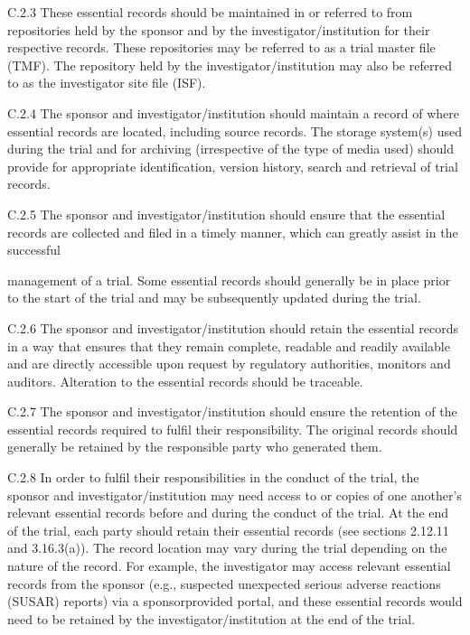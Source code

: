 \documentclass[11pt]{article}
\begin{document}
C.2.3 These essential records should be maintained in or referred to from repositories held by the sponsor and by the investigator/institution for their respective records. These repositories may be referred to as a trial master file (TMF). The repository held by the investigator/institution may also be referred to as the investigator site file (ISF).


C.2.4 The sponsor and investigator/institution should maintain a record of where essential records are located, including source records. The storage system(s) used during the trial and for archiving (irrespective of the type of media used) should provide for appropriate identification, version history, search and retrieval of trial records.


C.2.5 The sponsor and investigator/institution should ensure that the essential records are collected and filed in a timely manner, which can greatly assist in the successful


management of a trial. Some essential records should generally be in place prior to the start of the trial and may be subsequently updated during the trial.


C.2.6 The sponsor and investigator/institution should retain the essential records in a way that ensures that they remain complete, readable and readily available and are directly accessible upon request by regulatory authorities, monitors and auditors. Alteration to the essential records should be traceable.


C.2.7 The sponsor and investigator/institution should ensure the retention of the essential records required to fulfil their responsibility. The original records should generally be retained by the responsible party who generated them.


C.2.8 In order to fulfil their responsibilities in the conduct of the trial, the sponsor and investigator/institution may need access to or copies of one another's relevant essential records before and during the conduct of the trial. At the end of the trial, each party should retain their essential records (see sections 2.12.11 and 3.16.3(a)). The record location may vary during the trial depending on the nature of the record. For example, the investigator may access relevant essential records from the sponsor (e.g., suspected unexpected serious adverse reactions (SUSAR) reports) via a sponsorprovided portal, and these essential records would need to be retained by the investigator/institution at the end of the trial.
\end{document}
